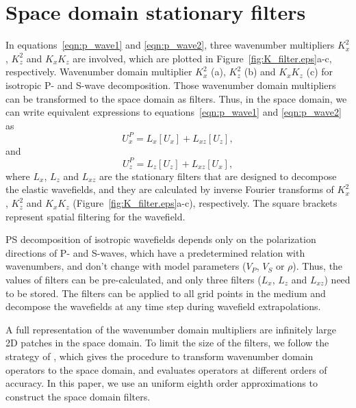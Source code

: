 \documentclass[manuscript,ulem,graphix,revised]{geophysics}
\begin{document}
\section{Space domain stationary filters}
\indent\indent
In equations~\ref{eqn:p_wave1} and \ref{eqn:p_wave2}, three wavenumber multipliers $K^2_x$, $K^2_z$ and $K_xK_z$ are involved, which are plotted in Figure~\ref{fig:K_filter.eps}a-c, respectively. 
{
Wavenumber domain multiplier $K^2_x$ (a), $K^2_z$ (b) and $K_xK_z$ (c) for isotropic P- and S-wave decomposition.
}
Those wavenumber domain multipliers can be transformed to the space domain as filters. Thus, in the space domain, we can write equivalent expressions to equations~\ref{eqn:p_wave1} and \ref{eqn:p_wave2} as
\begin{equation}
U^P_x = L_x [U_x] + L_{xz} [U_z],
\label{eqn:p_space1}
\end{equation}
and 
\begin{equation}
U^P_z = L_z [U_z] + L_{xz} [U_x],
\label{eqn:p_space2}
\end{equation}
where $L_x$, $L_z$ and $L_{xz}$ are the stationary filters that are designed to decompose the elastic wavefields, and they are calculated by inverse Fourier transforms of $K^2_x$, $K^2_z$ and $K_xK_z$ (Figure~\ref{fig:K_filter.eps}a-c), respectively. The square brackets represent spatial filtering for the wavefield. 

PS decomposition of isotropic wavefields depends only on the polarization directions of P- and S-waves, which have a predetermined relation with wavenumbers, and don't change with model parameters ($V_P$, $V_S$ or $\rho$). 
Thus, the values of filters can be pre-calculated, and only three filters ($L_x$, $L_z$ and $L_{xz}$) need to be stored. The filters can be applied to all grid points in the medium and decompose the wavefields at any time step during wavefield extrapolations. 

A full representation of the wavenumber domain multipliers are infinitely large 2D patches in the space domain. To limit the size of the filters, we follow the strategy of \citet{yan09}, which gives the procedure to transform wavenumber domain operators to the space domain, and evaluates operators at different orders of accuracy. 
In this paper, we use an uniform eighth order approximations to construct the space domain filters. 
\end{document}

